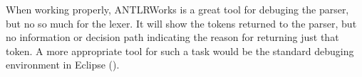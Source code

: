 When working properly, ANTLRWorks is a great tool for debuging the parser, but no so much for the lexer. It will show the tokens returned to the parser, but no information or decision path indicating the reason for returning just that token. A more appropriate tool for such a task would be the standard debuging environment in Eclipse (\cite{eclipse}).

